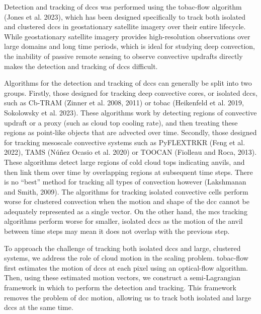 Detection and tracking of \acrshort{dcc}s was performed using the tobac-flow
algorithm (Jones et al. 2023), which has been designed specifically to
track both isolated and clustered \acrshort{dcc}s in geostationary satellite
imagery over their entire lifecycle. While geostationary satellite
imagery provides high-resolution observations over large domains and
long time periods, which is ideal for studying deep convection, the
inability of passive remote sensing to observe convective updrafts
directly makes the detection and tracking of \acrshort{dcc}s difficult.

Algorithms for the detection and tracking of \acrshort{dcc}s can generally be split
into two groups. Firstly, those designed for tracking deep convective
cores, or isolated \acrshort{dcc}s, such as Cb-TRAM (Zinner et al. 2008, 2011) or
tobac (Heikenfeld et al. 2019, Sokolowsky et al. 2023). These algorithms
work by detecting regions of convective updraft or a proxy (such as
cloud top cooling rate), and then treating these regions as point-like
objects that are advected over time. Secondly, those designed for
tracking mesoscale convective systems such as PyFLEXTRKR (Feng et al.
2022), TAMS (Núñez Ocasio et al. 2020) or TOOCAN (Fiolleau and Roca,
2013). These algorithms detect large regions of cold cloud tops
indicating anvils, and then link them over time by overlapping regions
at subsequent time steps. There is no ``best'' method for tracking all
types of convection however (Lakshmanan and Smith, 2009). The algorithms
for tracking isolated convective cells perform worse for clustered
convection when the motion and shape of the \acrshort{dcc} cannot be adequately
represented as a single vector. On the other hand, the \acrshort{mcs} tracking
algorithms perform worse for smaller, isolated \acrshort{dcc}s as the motion of the
anvil between time steps may mean it does not overlap with the previous
step.

To approach the challenge of tracking both isolated \acrshort{dcc}s and large,
clustered systems, we address the role of cloud motion in the scaling
problem. tobac-flow first estimates the motion of \acrshort{dcc}s at each pixel
using an optical-flow algorithm. Then, using these estimated motion
vectors, we construct a semi-Lagrangian framework in which to perform
the detection and tracking. This framework removes the problem of \acrshort{dcc}
motion, allowing us to track both isolated and large \acrshort{dcc}s at the same
time.

